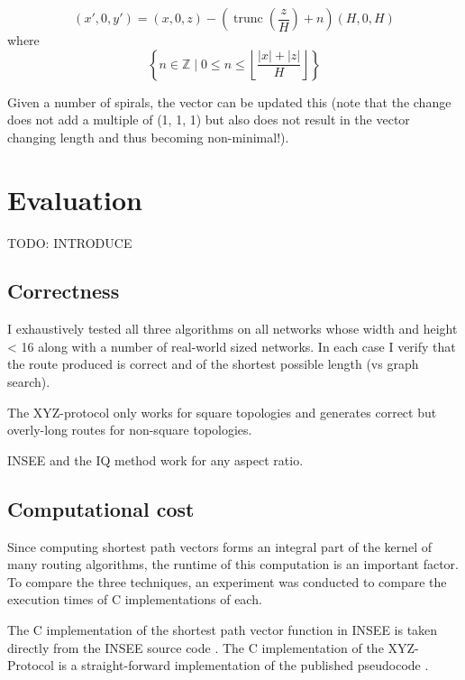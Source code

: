 			\begin{equation}
				(x', 0, y') = (x, 0, z) - (\operatorname{trunc}\left(\frac{z}{H}\right) + n)(H, 0, H)
			\end{equation}
			where
			\begin{equation}
				\left\{
					n \in \mathbb{Z}
				\;\Big|\;
					0 \le n \le
						\left\lfloor
							\frac{\left|x\right| + \left|z\right|}{H}
						\right\rfloor
				\right\}
			\end{equation}
			
			Given a number of spirals, the vector can be updated this (note that the
			change does not add a multiple of (1, 1, 1) but also does not result in
			the vector changing length and thus becoming non-minimal!).
	
	\section{Evaluation}
		
		TODO: INTRODUCE
		
		\subsection{Correctness}
			
			I exhaustively tested all three algorithms on all networks whose width
			and height < 16 along with a number of real-world sized networks. In each
			case I verify that the route produced is correct and of the shortest
			possible length (vs graph search).
			
			The XYZ-protocol only works for square topologies and generates correct
			but overly-long routes for non-square topologies.
			
			INSEE and the IQ method work for any aspect ratio.
		
		\subsection{Computational cost}
			
			Since computing shortest path vectors forms an integral part of the
			kernel of many routing algorithms, the runtime of this computation is an
			important factor. To compare the three techniques, an experiment was
			conducted to compare the execution times of C implementations of each.
			
			The C implementation of the shortest path vector function in INSEE is
			taken directly from the INSEE source code \cite{navaridas09}. The C
			implementation of the XYZ-Protocol is a straight-forward implementation
			of the published pseudocode \cite{hoffmann15}.
			
